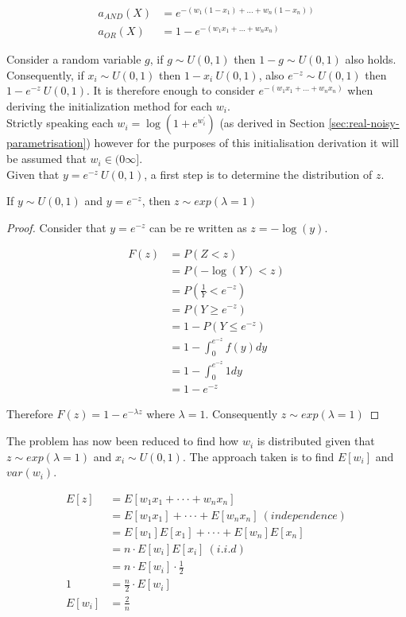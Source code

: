 \begin{align*}
	a_{AND}(X) &= e^{-(w_1(1 - x_1) + ... + w_n(1 - x_n))}\\
	a_{OR}(X) &= 1 - e^{-(w_1x_1 + ... + w_nx_n)}
\end{align*}

Consider a random variable $g$, if $g \sim U(0,1)$ then $1 - g \sim U(0,1)$ also holds. Consequently, if $x_i \sim U(0,1)$ then $1 - x_i ~ U(0,1)$, also $e^{-z} \sim U(0,1)$ then $1 - e^{-z} ~ U(0,1)$. It is therefore enough to consider $e^{-(w_1x_1 + ... + w_nx_n)}$ when deriving the initialization method for each $w_i$.\\

Strictly speaking each $w_i = \log(1 + e^{w^{'}_i})$ (as derived in Section \ref{sec:real-noisy-parametrisation}) however for the purposes of this initialisation derivation it will be assumed that $w_i \in (0 \infty]$.\\

Given that $y = e^{-z} ~ U(0,1)$, a first step is to determine the distribution of $z$.

\begin{theorem}
	If $y \sim U(0,1)$ and $y = e^{-z}$, then $z \sim exp(\lambda = 1)$
\end{theorem}
\begin{proof}
	Consider that $y = e^{-z}$ can be re written as $z = -\log(y)$.
	
	\begin{align*}
		F(z) &= P(Z < z)\\
		&= P(-\log(Y) < z)\\
		&= P(\frac{1}{Y} < e^{-z})\\
		&= P(Y \geq e^{-z})\\
		&= 1 - P(Y \leq e^{-z})\\
		&= 1 - \int_{0}^{e^{-z}} f(y) dy\\
		&= 1 - \int_{0}^{e^{-z}} 1 dy\\
		&= 1 - e^{-z}
	\end{align*}
	
	Therefore $F(z) = 1 - e^{-\lambda z}$ where $\lambda = 1$. Consequently $z \sim exp(\lambda = 1)$
\end{proof}

The problem has now been reduced to find how $w_i$ is distributed given that $z \sim exp(\lambda = 1)$ and $x_i \sim U(0,1)$. The approach taken is to find $E[w_i]$ and $var(w_i)$.

\begin{align*}
	E[z] &= E[w_1x_1 + \cdot \cdot \cdot + w_nx_n]\\
	&= E[w_1x_1] + \cdot \cdot \cdot + E[w_nx_n]\ (independence)\\
	&= E[w_1]E[x_1] + \cdot \cdot \cdot + E[w_n]E[x_n]\\
	&= n \cdot E[w_i]E[x_i]\ (i.i.d)\\
	&= n \cdot E[w_i] \cdot \frac{1}{2}\\
	1 &= \frac{n}{2} \cdot E[w_i]\\
	E[w_i] &= \frac{2}{n}
\end{align*}


